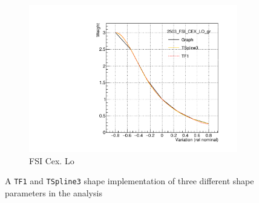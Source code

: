 \begin{figure}[h]
	\begin{subfigure}[t]{0.32\textwidth}
		\includegraphics[width=\textwidth, trim={5mm 5mm 15mm 15mm}, clip,page=1]{figures/niwg/splines/fsi_cex_lo}
		\caption{FSI Cex. Lo}
	\end{subfigure}
\caption{A \texttt{TF1} and \texttt{TSpline3} shape implementation of three different shape parameters in the analysis}
\label{fig:xsec_splines}
\end{figure}

